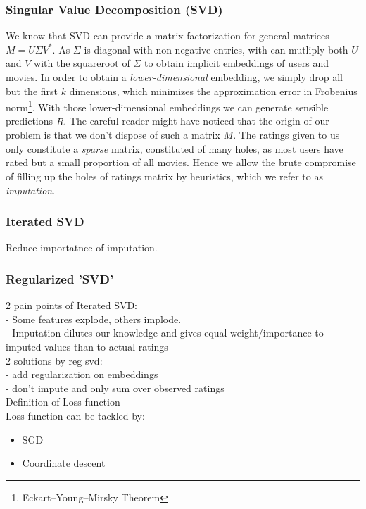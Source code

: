 \documentclass[10pt,conference,compsocconf]{IEEEtran}
\begin{document}
\subsubsection{Singular Value Decomposition (SVD)}

We know that SVD can provide a matrix factorization for general matrices $M = U \Sigma V^*$. As $\Sigma$ is diagonal with non-negative entries, with can mutliply both $U$ and $V$ with the squareroot of $\Sigma$ to obtain implicit embeddings of users and movies. In order to obtain a \emph{lower-dimensional} embedding, we simply drop all but the first $k$ dimensions, which minimizes the approximation error in Frobenius norm\footnote{Eckart–Young–Mirsky Theorem}. With those lower-dimensional embeddings we can generate sensible predictions $\hat{R}$. The careful reader might have noticed that the origin of our problem is that we don't dispose of such a matrix $M$. The ratings given to us only constitute a \emph{sparse} matrix, constituted of many holes, as most users have rated but a small proportion of all movies. Hence we allow the brute compromise of filling up the holes of ratings matrix by heuristics, which we refer to as \emph{imputation}. 

\subsubsection{Iterated SVD}
Reduce importatnce of imputation.

\subsubsection{Regularized 'SVD'}
2 pain points of Iterated SVD: \\
- Some features explode, others implode. \\
- Imputation dilutes our knowledge and gives equal weight/importance to imputed values than to actual ratings \\
2 solutions by reg svd:\\
- add regularization on embeddings\\
- don't impute and only sum over observed ratings\\
Definition of Loss function\\
Loss function can be tackled by:
\begin{itemize}
\item SGD
\item Coordinate descent
\end{itemize}
\end{document}
